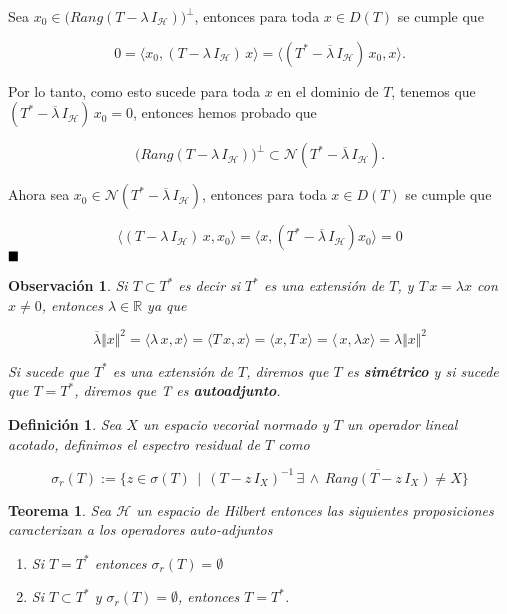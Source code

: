 \documentclass[letterpaper]{report}
\newtheorem{teorema}{Teorema}[chapter]
\newtheorem{obs}{Observaci\'on}
\newtheorem{def.}{Definici\'on}[chapter]
\newcommand{\hil}{\ensuremath{\mathcal H }}
\newcommand{\re}{\ensuremath{\mathbb R }}
\newcommand{\nuc}{\ensuremath{\mathcal{N}}}
\newcommand{\qed}{\ensuremath{\hspace*{0em plus 1fill}\blacksquare}}
\begin{document}
\begin{dem}
Sea $x_0\in\big(Rang(T-\lambda\,I_{\hil})\big)^{\bot}$, entonces para toda $x\in D(T)$ se cumple que

$$
0=\langle x_0,(T-\lambda\,I_{\hil})\,x\rangle=
\langle(T^*-\overline{\lambda}\,I_{\hil})\,x_0,x\rangle.
$$

Por lo tanto, como esto sucede para toda $x$ en el dominio de $T$, tenemos que \hbox{$(T^*-\overline{\lambda}\,I_{\hil})\,x_0=0$}, entonces hemos probado que

$$
\big(Rang(T-\lambda\,I_{\hil})\big)^{\bot}
\subset
\nuc(T^*-\overline{\lambda}\,I_{\hil}).
$$

Ahora sea $x_0\in\nuc(T^*-\overline{\lambda}\,I_{\hil})$, entonces para toda $x\in D(T)$ se cumple que

$$
\langle(T-\lambda\,I_{\hil})\,x,x_0\rangle=
\langle x,(T^*-\overline{\lambda}\,I_{\hil})x_0\rangle=0
$$\qed
\end{dem}

\begin{obs}
Si $T\subset T^*$ es decir si $T^*$ es una extensión de $T$, y $T\,x=\lambda x$ con $x\neq0$, entonces $\lambda\in\re$ ya que

$$
\overline{\lambda}\Vert x\Vert^2=
\langle\lambda\,x,x\rangle=
\langle T\,x,x\rangle=
\langle x,T\,x\rangle=
\langle\,x,\lambda x\rangle=
\lambda\Vert x\Vert^2
$$

\noindent Si sucede que $T^*$ es una extensión de $T$, diremos que $T$ es \textit{\textbf{simétrico}} y si sucede que $T=T^*$, diremos que T es \textit{\textbf{autoadjunto}}.
\end{obs}

\begin{def.}
Sea $X$ un espacio vecorial normado y $T$ un operador lineal acotado, definimos el espectro residual de $T$ como

\begin{equation}
\sigma_r(T):=\lbrace z\in\sigma(T)\,\mid\,(T-z\,I_X)^{-1}\,\exists\,\wedge\,\overline{Rang(T-z\,I_X)}\neq X\rbrace
\end{equation} 
\end{def.}

\begin{teorema}\label{teo2}
Sea $\hil$ un espacio de Hilbert entonces las siguientes proposiciones caracterizan a los operadores auto-adjuntos

\begin{enumerate}
\item[i)] Si $T=T^*$ entonces $\sigma_r(T)=\emptyset$

\item[ii)] Si $T\subset T^*$ y $\sigma_r(T)=\emptyset$, entonces $T=T^*$.
\end{enumerate}
\end{teorema}
\end{document}
